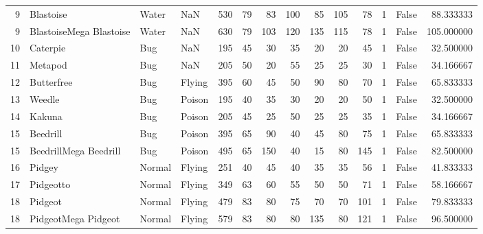 \begin{tabular}{rlllrrrrrrrrlr}
   9 &                  Blastoise &     Water &       NaN &    530 &   79 &      83 &      100 &       85 &      105 &     78 &           1 &      False &   88.333333 \\
   9 &    BlastoiseMega Blastoise &     Water &       NaN &    630 &   79 &     103 &      120 &      135 &      115 &     78 &           1 &      False &  105.000000 \\
  10 &                   Caterpie &       Bug &       NaN &    195 &   45 &      30 &       35 &       20 &       20 &     45 &           1 &      False &   32.500000 \\
  11 &                    Metapod &       Bug &       NaN &    205 &   50 &      20 &       55 &       25 &       25 &     30 &           1 &      False &   34.166667 \\
  12 &                 Butterfree &       Bug &    Flying &    395 &   60 &      45 &       50 &       90 &       80 &     70 &           1 &      False &   65.833333 \\
  13 &                     Weedle &       Bug &    Poison &    195 &   40 &      35 &       30 &       20 &       20 &     50 &           1 &      False &   32.500000 \\
  14 &                     Kakuna &       Bug &    Poison &    205 &   45 &      25 &       50 &       25 &       25 &     35 &           1 &      False &   34.166667 \\
  15 &                   Beedrill &       Bug &    Poison &    395 &   65 &      90 &       40 &       45 &       80 &     75 &           1 &      False &   65.833333 \\
  15 &      BeedrillMega Beedrill &       Bug &    Poison &    495 &   65 &     150 &       40 &       15 &       80 &    145 &           1 &      False &   82.500000 \\
  16 &                     Pidgey &    Normal &    Flying &    251 &   40 &      45 &       40 &       35 &       35 &     56 &           1 &      False &   41.833333 \\
  17 &                  Pidgeotto &    Normal &    Flying &    349 &   63 &      60 &       55 &       50 &       50 &     71 &           1 &      False &   58.166667 \\
  18 &                    Pidgeot &    Normal &    Flying &    479 &   83 &      80 &       75 &       70 &       70 &    101 &           1 &      False &   79.833333 \\
  18 &        PidgeotMega Pidgeot &    Normal &    Flying &    579 &   83 &      80 &       80 &      135 &       80 &    121 &           1 &      False &   96.500000 \\

\end{tabular}
